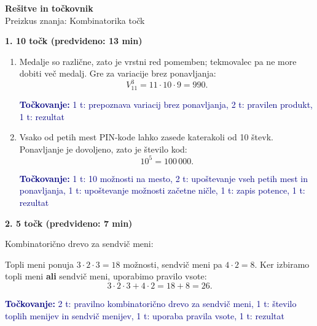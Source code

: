 \documentclass[11pt,a4paper]{article}
\newenvironment{taskbox}[1]{%
    \par\addvspace{24pt}%
    \noindent\textbf{\large #1}\par
}{\par\addvspace{16pt}}
\newcommand{\rubric}[1]{%
    \par\smallskip\noindent
    {\small\textcolor{navy}{\textbf{Točkovanje:} #1}}%
    \par\smallskip}
\begin{document}
\begin{center}
    {\LARGE\textbf{Rešitve in točkovnik}}\\[3pt]
    {\large Preizkus znanja: Kombinatorika  točk}
\end{center}

\begin{taskbox}{1. \hfill 10 točk \quad (predvideno: 13 min)}
\begin{enumerate}[label=\alph*)]
    \item Medalje so različne, zato je vrstni red pomemben; tekmovalec pa ne
    more dobiti več medalj. Gre za variacije brez ponavljanja:
    \[
        V_{11}^3=11\cdot10\cdot9=\boxed{990}.
    \]
    \rubric{1 t: prepoznava variacij brez ponavljanja, 2 t: pravilen produkt,
    1 t: rezultat}
    \item Vsako od petih mest PIN-kode lahko zasede katerakoli od 10 števk.
    Ponavljanje je dovoljeno, zato je število kod:
    \[
        10^5=\boxed{100\,000}.
    \]
    \rubric{1 t: 10 možnosti na mesto, 2 t: upoštevanje vseh petih mest in
    ponavljanja, 1 t: upoštevanje možnosti začetne ničle, 1 t: zapis potence,
    1 t: rezultat}
\end{enumerate}
\end{taskbox}

\begin{taskbox}{2. \hfill 5 točk \quad (predvideno: 7 min)}
Kombinatorično drevo za sendvič meni:
\begin{center}
\end{center}
Topli meni ponuja \(3\cdot2\cdot3=18\) možnosti, sendvič meni pa
\(4\cdot2=8\). Ker izbiramo topli meni \textbf{ali} sendvič meni,
uporabimo pravilo vsote:
\[
    3\cdot2\cdot3+4\cdot2=18+8=\boxed{26}.
\]
\rubric{2 t: pravilno kombinatorično drevo za sendvič meni, 1 t: število toplih
menijev in sendvič menijev, 1 t: uporaba pravila vsote, 1 t: rezultat}
\end{taskbox}
\end{document}
